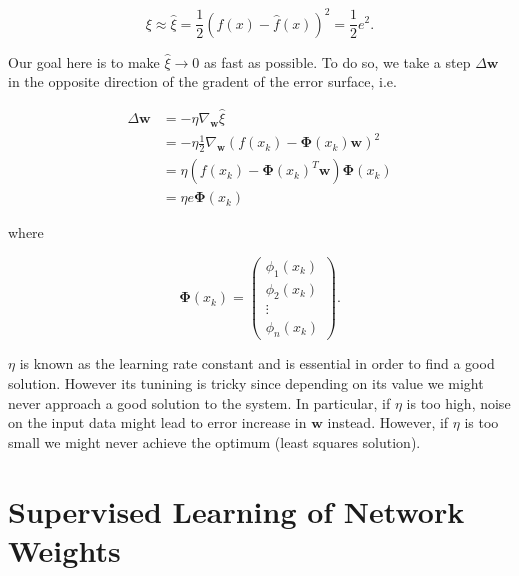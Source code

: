 \documentclass[letterpaper, 10 pt, conference]{ieeeconf}  %
\begin{document}
$$
\xi \approx \hat{\xi} = \frac{1}{2} (f(x) - \hat{f}(x))^2 = \frac{1}{2} e^2.
$$

Our goal here is to make $\hat{\xi} \to 0$ as fast as possible. To do so, we take a step $\Delta \textbf{w}$ in the opposite direction of the gradent of the error surface, i.e.

\begin{equation} \nonumber
\begin{split}
\Delta \textbf{w} &= -\eta \nabla_\textbf{w} \hat{\xi} \\
&= -\eta \frac{1}{2}\nabla_\textbf{w}(f(x_k)-\boldsymbol{\Phi}(x_k)\textbf{w})^2 \\
&= \eta(f(x_k)-\boldsymbol{\Phi}(x_k)^T\textbf{w})\boldsymbol{\Phi}(x_k) \\
&= \eta e \boldsymbol{\Phi}(x_k) 
\end{split}
\end{equation}

where 

\begin{equation} \nonumber
\boldsymbol{\Phi}(x_k) =
\begin{pmatrix}
\phi_1(x_k) \\
\phi_2(x_k) \\
\vdots \\
\phi_n(x_k)
\end{pmatrix}.
\end{equation}

$\eta$ is known as the learning rate constant and is essential in order to find a good solution. However its tunining is tricky since depending on its value we might never approach a good solution to the system. In particular, if $\eta$ is too high, noise on the input data might lead to error increase in $\textbf{w}$ instead. However, if $\eta$ is too small we might never achieve the optimum (least squares solution).
\cite{etzioni2011less}

\section{Supervised Learning of Network Weights}



\end{document}
